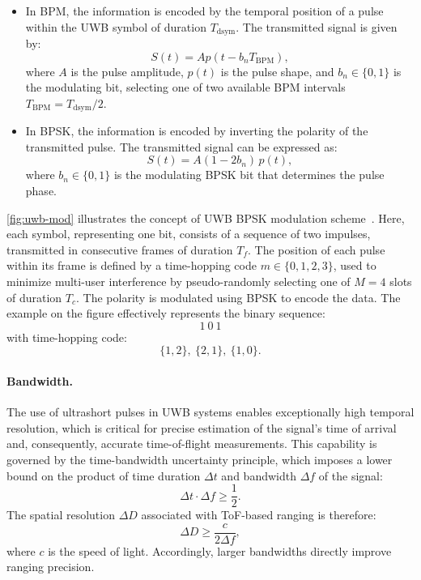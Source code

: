 \begin{itemize}
\item In BPM, the information is encoded by the temporal position of a pulse within the UWB symbol of duration $T_{\text{dsym}}$. The transmitted signal is given by:
\begin{equation}
S(t) = A p\left(t - b_n T_{\text{BPM}}\right),
\end{equation}
where $A$ is the pulse amplitude, $p(t)$ is the pulse shape, and $b_n \in \{0, 1\}$ is the modulating bit, selecting one of two available BPM intervals $T_{\text{BPM}} = T_{\text{dsym}}/{2}$.

\item In BPSK, the information is encoded by inverting the polarity of the transmitted pulse. The transmitted signal can be expressed as:
\begin{equation}
S(t) = A (1 - 2b_n) \, p(t),
\end{equation}
where $b_n \in \{0, 1\}$ is the modulating BPSK bit that determines the pulse phase.
\end{itemize}

\autoref{fig:uwb-mod} illustrates the concept of UWB BPSK modulation scheme~\cite{Sahinoglu2008UWB}. Here, each symbol, representing one bit, consists of a sequence of two impulses, transmitted in consecutive frames of duration $T_f$. The position of each pulse within its frame is defined by a time-hopping code $m \in \{0, 1, 2, 3\}$, used to minimize multi-user interference by pseudo-randomly selecting one of $M = 4$ slots of duration $T_c$. The polarity is modulated using BPSK to encode the data. The example on the figure effectively represents the binary sequence:
$$
\boxed{1\ 0\ 1}
$$ 
with time-hopping code: 
$$
\{1, 2\},\ \{2, 1\},\ \{1, 0\}.
$$

\paragraph{Bandwidth.}
The use of ultrashort pulses in UWB systems enables exceptionally high temporal resolution, which is critical for precise estimation of the signal's time of arrival and, consequently, accurate time-of-flight measurements. This capability is governed by the time-bandwidth uncertainty principle, which imposes a lower bound on the product of time duration $\Delta t$ and bandwidth $\Delta f$ of the signal:
\begin{equation} 
\Delta t \cdot \Delta f \geq \frac{1}{2}. 
\end{equation}
The spatial resolution $\Delta D$ associated with ToF-based ranging is therefore:
\begin{equation} 
\Delta D \geq \frac{c}{2\Delta f}, 
\end{equation}
where $c$ is the speed of light. Accordingly, larger bandwidths directly improve ranging precision.

